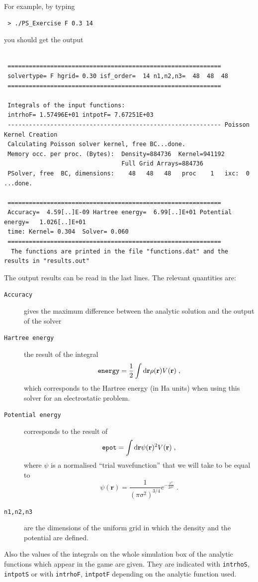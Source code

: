 \documentclass[a4paper]{article}
\newcommand{\dd}{{\rm d}}
\newcommand{\be}{\begin{equation}}
\newcommand{\ee}{\end{equation}}
\begin{document}
For example, by typing
\begin{verbatim}
 > ./PS_Exercise F 0.3 14
\end{verbatim}
you should get the output
\begin{verbatim}
 
 ============================================================
 solvertype= F hgrid= 0.30 isf_order=  14 n1,n2,n3=  48  48  48
 ============================================================

 Integrals of the input functions:
 intrhoF= 1.57496E+01 intpotF= 7.67251E+03
 ------------------------------------------------------------ Poisson Kernel Creation
 Calculating Poisson solver kernel, free BC...done.
 Memory occ. per proc. (Bytes):  Density=884736  Kernel=941192
                                 Full Grid Arrays=884736
 PSolver, free  BC, dimensions:    48   48   48   proc    1   ixc:  0 ...done.

 ============================================================
 Accuracy=  4.59[..]E-09 Hartree energy=  6.99[..]E+01 Potential energy=   1.026[..]E+01
 time: Kernel= 0.304  Solver= 0.060
 ============================================================
  The functions are printed in the file "functions.dat" and the results in "results.out"

\end{verbatim}
The output results can be read in the last lines. The relevant quantities are:
\begin{description}
\item[\texttt{Accuracy}] gives the maximum difference between the analytic solution and the output of the solver
\item[\texttt{Hartree energy}] the result of the integral
\be
\text{\texttt{energy}}=\frac{1}{2}\int \dd \mathbf{r} \rho(\mathbf{r}) V(\mathbf{r})\;,
\ee
which corresponds to the Hartree energy (in Ha units) when using this solver for an electrostatic problem.
\item[\texttt{Potential energy}] corresponds to the result of
\be
\texttt{epot}= \int \dd \mathbf{r} \psi(\mathbf{r})^2 V(\mathbf{r})\;,
\ee
where $\psi$ is a normalised ``trial wavefunction'' that we will take to be equal to
\be
\psi(\mathbf{r})=\frac{1}{(\pi \sigma^2)^{3/4}} e^{-\frac{r^2}{2 \sigma^2}}\;.
\ee
\item[\texttt{n1,n2,n3}] are the dimensions of the uniform grid in which the density and the potential are defined.
\end{description}
Also the values of the integrals on the whole simulation box of the analytic functions which appear in the game are given. They are indicated with \texttt{intrhoS}, \texttt{intpotS} or with \texttt{intrhoF}, \texttt{intpotF} depending on the analytic function used.
\end{document}
